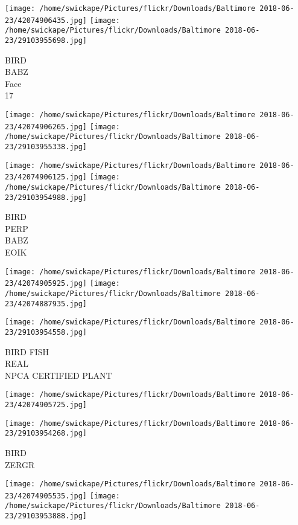 \documentclass[10pt,letterpaper]{article}
\begin{document}
\texttt{[image: /home/swickape/Pictures/flickr/Downloads/Baltimore 2018-06-23/42074906435.jpg]}
\texttt{[image: /home/swickape/Pictures/flickr/Downloads/Baltimore 2018-06-23/29103955698.jpg]}

BIRD\\
BABZ\\
Face\\
17\\
\pagebreak

\texttt{[image: /home/swickape/Pictures/flickr/Downloads/Baltimore 2018-06-23/42074906265.jpg]}
\texttt{[image: /home/swickape/Pictures/flickr/Downloads/Baltimore 2018-06-23/29103955338.jpg]}

\texttt{[image: /home/swickape/Pictures/flickr/Downloads/Baltimore 2018-06-23/42074906125.jpg]}
\texttt{[image: /home/swickape/Pictures/flickr/Downloads/Baltimore 2018-06-23/29103954988.jpg]}

BIRD\\
PERP\\
BABZ\\
EOIK\\
\pagebreak

\texttt{[image: /home/swickape/Pictures/flickr/Downloads/Baltimore 2018-06-23/42074905925.jpg]}
\texttt{[image: /home/swickape/Pictures/flickr/Downloads/Baltimore 2018-06-23/42074887935.jpg]}

\texttt{[image: /home/swickape/Pictures/flickr/Downloads/Baltimore 2018-06-23/29103954558.jpg]}

BIRD FISH\\
REAL\\
NPCA CERTIFIED PLANT\\
\pagebreak

\texttt{[image: /home/swickape/Pictures/flickr/Downloads/Baltimore 2018-06-23/42074905725.jpg]}

\vspace{0.25in}
\texttt{[image: /home/swickape/Pictures/flickr/Downloads/Baltimore 2018-06-23/29103954268.jpg]}

BIRD\\
ZERGR\\
\pagebreak

\texttt{[image: /home/swickape/Pictures/flickr/Downloads/Baltimore 2018-06-23/42074905535.jpg]}
\texttt{[image: /home/swickape/Pictures/flickr/Downloads/Baltimore 2018-06-23/29103953888.jpg]}
\end{document}
